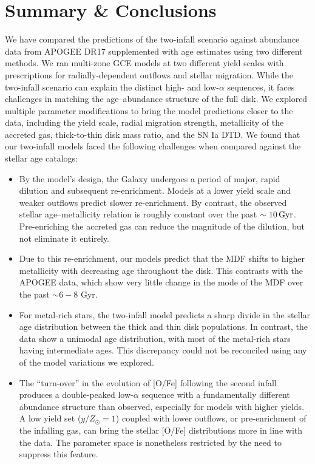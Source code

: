 \documentclass[twocolumn,twocolappendix,linenumbers]{aastex631}
\newcommand{\yZ}[1]{$y/Z_\odot=#1$}
\newcommand{\Gyr}{\,{\rm Gyr}}
\begin{document}
\section{Summary \& Conclusions}
\label{sec:conclusions}

We have compared the predictions of the two-infall scenario against abundance data from APOGEE DR17 supplemented with age estimates using two different methods. We ran multi-zone GCE models at two different yield scales with prescriptions for radially-dependent outflows and stellar migration. While the two-infall scenario can explain the distinct high- and low-$\alpha$ sequences, it faces challenges in matching the age--abundance structure of the full disk. We explored multiple parameter modifications to bring the model predictions closer to the data, including the yield scale, radial migration strength, metallicity of the accreted gas, thick-to-thin disk mass ratio, and the SN Ia DTD. We found that our two-infall models faced the following challenges when compared against the stellar age catalogs:

\begin{itemize}
    \item By the model's design, the Galaxy undergoes a period of major, rapid dilution and subsequent re-enrichment. Models at a lower yield scale and weaker outflows predict slower re-enrichment. By contrast, the observed stellar age--metallicity relation is roughly constant over the past $\sim10\Gyr$. Pre-enriching the accreted gas can reduce the magnitude of the dilution, but not eliminate it entirely.
    \item Due to this re-enrichment, our models predict that the MDF shifts to higher metallicity with decreasing age throughout the disk. This contrasts with the APOGEE data, which show very little change in the mode of the MDF over the past $\sim6-8$ Gyr.
    \item For metal-rich stars, the two-infall model predicts a sharp divide in the stellar age distribution between the thick and thin disk populations. In contrast, the data show a unimodal age distribution, with most of the metal-rich stars having intermediate ages. This discrepancy could not be reconciled using any of the model variations we explored.
    \item The ``turn-over'' in the evolution of [O/Fe] following the second infall produces a double-peaked low-$\alpha$ sequence with a fundamentally different abundance structure than observed, especially for models with higher yields. A low yield set (\yZ{1}) coupled with lower outflows, or pre-enrichment of the infalling gas, can bring the stellar [O/Fe] distributions more in line with the data. The parameter space is nonetheless restricted by the need to suppress this feature.
\end{itemize}
\end{document}
